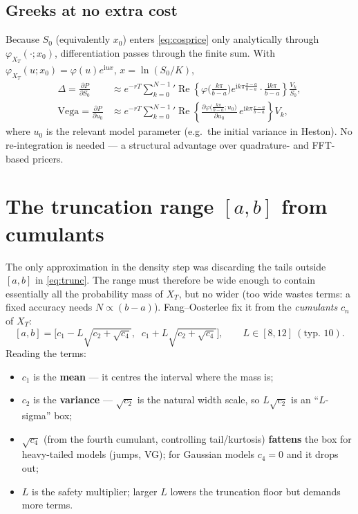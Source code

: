 \documentclass[11pt]{article}
\newcommand{\Real}{\operatorname{Re}}
\newcommand{\ii}{\mathrm{i}}
\newcommand{\ch}{\varphi}
\begin{document}
\subsection{Greeks at no extra cost}
Because $S_0$ (equivalently $x_0$) enters \eqref{eq:cosprice} only analytically through $\ch_{X_T}(\cdot;x_0)$,
differentiation passes through the finite sum. With $\ch_{X_T}(u;x_0)=\ch(u)e^{\ii u x}$, $x=\ln(S_0/K)$,
\begin{align}
\Delta=\frac{\partial P}{\partial S_0}&\approx e^{-rT}{\sum_{k=0}^{N-1}}'
\Real\!\left\{\ch\!\Big(\tfrac{k\pi}{b-a}\Big)e^{\ii k\pi\frac{x-a}{b-a}}\cdot
\frac{\ii k\pi}{b-a}\right\}\frac{V_k}{S_0},\\
\text{Vega}=\frac{\partial P}{\partial u_0}&\approx e^{-rT}{\sum_{k=0}^{N-1}}'
\Real\!\left\{\frac{\partial\ch\!\big(\tfrac{k\pi}{b-a};u_0\big)}{\partial u_0}\,
e^{\ii k\pi\frac{x-a}{b-a}}\right\}V_k ,
\end{align}
where $u_0$ is the relevant model parameter (e.g.\ the initial variance in Heston). No re-integration is
needed --- a structural advantage over quadrature- and FFT-based pricers.

\section{The truncation range $[a,b]$ from cumulants}\label{sec:range}

The only approximation in the density step was discarding the tails outside $[a,b]$ in \eqref{eq:trunc}. The
range must therefore be wide enough to contain essentially all the probability mass of $X_T$, but no wider
(too wide wastes terms: a fixed accuracy needs $N\propto(b-a)$). Fang--Oosterlee fix it from the
\emph{cumulants} $c_n$ of $X_T$:
\begin{equation}\label{eq:abrange}
\boxed{\;[a,b]=\Big[c_1-L\sqrt{c_2+\sqrt{c_4}},\;\; c_1+L\sqrt{c_2+\sqrt{c_4}}\Big],
\qquad L\in[8,12]\ (\text{typ. }10).\;}
\end{equation}
Reading the terms:
\begin{itemize}[leftmargin=*]
  \item $c_1$ is the \textbf{mean} --- it centres the interval where the mass is;
  \item $c_2$ is the \textbf{variance} --- $\sqrt{c_2}$ is the natural width scale, so $L\sqrt{c_2}$ is an
  ``$L$-sigma'' box;
  \item $\sqrt{c_4}$ (from the fourth cumulant, controlling tail/kurtosis) \textbf{fattens} the box for
  heavy-tailed models (jumps, VG); for Gaussian models $c_4=0$ and it drops out;
  \item $L$ is the safety multiplier; larger $L$ lowers the truncation floor but demands more terms.
\end{itemize}
\end{document}
